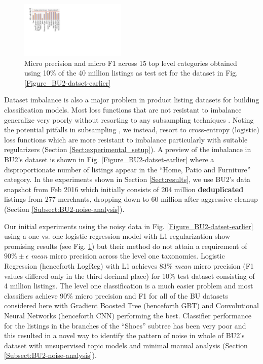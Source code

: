 \begin{figure}
	\centering
	\vspace{-0.6cm}
	\includegraphics[width=0.45\textwidth]{images/BU2-Dec2015-LogRegL1}
	\vspace{-0.7cm}
	\caption{{\small Micro precision and micro F1 across 15 top level categories obtained using 10\% of the 40 million listings as test set for the dataset in Fig. \ref{Figure_BU2-datset-earlier}}}
	\label{Figure_BU2-WUC-LogRegL1}
	\vspace{-0.5cm}
\end{figure} 
Dataset imbalance is also a major problem in product listing datasets for building classification models.
Most loss functions that are not resistant to imbalance generalize very poorly without resorting to any subsampling techniques \cite{Chawla02:SMOTE}. 
Noting the potential pitfalls in subsampling \cite{Sun14}, we instead, resort to cross-entropy (logistic) loss functions which are more resistant to imbalance particularly with suitable regularizers (Section \ref{Sect:experimental_setup}). 
A preview of the imbalance in BU2's dataset is shown in Fig. \ref{Figure_BU2-datset-earlier} where a disproportionate number of listings appear in the ``Home, Patio and Furniture'' category.
In the experiments shown in Section \ref{Sect:results}, we use BU2's data snapshot from Feb 2016 which initially consists of 204 million \textbf{deduplicated} listings from 277 merchants, dropping down to 60 million after aggressive cleanup (Section \ref{Subsect:BU2-noise-analysis}).



Our initial experiments using the noisy data in Fig. \ref{Figure_BU2-datset-earlier} using a one vs. one logistic regression model with L1 regularization \cite{Yu13:EBay,LibShortText} show promising results (see Fig. \ref{Figure_BU2-WUC-LogRegL1}) but their method do not attain a requirement of $90\% \pm \epsilon$  \textit{mean} micro precision across the level one taxonomies.
Logistic Regression (henceforth LogReg) with L1 achieves 83\% \textit{mean} micro precision (F1 values differed only in the third decimal place) for 10\% test dataset consisting of 4 million listings.
The level one classification is a much easier problem and most classifiers achieve 90\% micro precision and F1 for all of the BU datasets considered here with Gradient Boosted Tree (henceforth GBT) \cite{Friedman:GBT} and Convolutional Neural Networks (henceforth CNN) \cite{LeBe95, Kim14} performing the best. 
Classifier performance for the listings in the branches of the ``Shoes'' subtree has been very poor and this resulted in a novel way to identify the pattern of noise in whole of BU2's dataset with unsupervised topic models and minimal manual analysis (Section \ref{Subsect:BU2-noise-analysis}).

